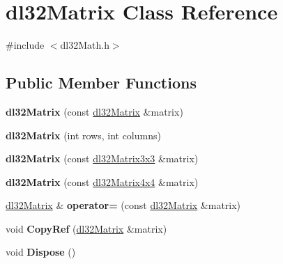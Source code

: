 \hypertarget{classdl32_matrix}{\section{dl32\-Matrix Class Reference}
\label{classdl32_matrix}
}


{\ttfamily \#include $<$dl32\-Math.\-h$>$}

\subsection*{Public Member Functions}
\begin{DoxyCompactItemize}
\item 
\hypertarget{classdl32_matrix_a3ece7a975e04320920fc1fb4deca1b30}{{\bfseries dl32\-Matrix} (const \hyperlink{classdl32_matrix}{dl32\-Matrix} \&matrix)}\label{classdl32_matrix_a3ece7a975e04320920fc1fb4deca1b30}

\item 
\hypertarget{classdl32_matrix_acac14a6c8baf39be7ed416e8b0d4e7ef}{{\bfseries dl32\-Matrix} (int rows, int columns)}\label{classdl32_matrix_acac14a6c8baf39be7ed416e8b0d4e7ef}

\item 
\hypertarget{classdl32_matrix_a9f2ea24a0ae05d96978f481ed6e1e26d}{{\bfseries dl32\-Matrix} (const \hyperlink{structdl32_matrix3x3}{dl32\-Matrix3x3} \&matrix)}\label{classdl32_matrix_a9f2ea24a0ae05d96978f481ed6e1e26d}

\item 
\hypertarget{classdl32_matrix_ac5c66c0f121fd0518d7fe41e09d20d87}{{\bfseries dl32\-Matrix} (const \hyperlink{structdl32_matrix4x4}{dl32\-Matrix4x4} \&matrix)}\label{classdl32_matrix_ac5c66c0f121fd0518d7fe41e09d20d87}

\item 
\hypertarget{classdl32_matrix_a25c6de9e7062941214ab339920cb9f49}{\hyperlink{classdl32_matrix}{dl32\-Matrix} \& {\bfseries operator=} (const \hyperlink{classdl32_matrix}{dl32\-Matrix} \&matrix)}\label{classdl32_matrix_a25c6de9e7062941214ab339920cb9f49}

\item 
\hypertarget{classdl32_matrix_a1cfdb28b1b1177c3589ad4ead45deb44}{void {\bfseries Copy\-Ref} (\hyperlink{classdl32_matrix}{dl32\-Matrix} \&matrix)}\label{classdl32_matrix_a1cfdb28b1b1177c3589ad4ead45deb44}

\item 
\hypertarget{classdl32_matrix_a7ee5a0b7ee1491daa80b6906052f54db}{void {\bfseries Dispose} ()}\label{classdl32_matrix_a7ee5a0b7ee1491daa80b6906052f54db}


\end{DoxyCompactItemize}
